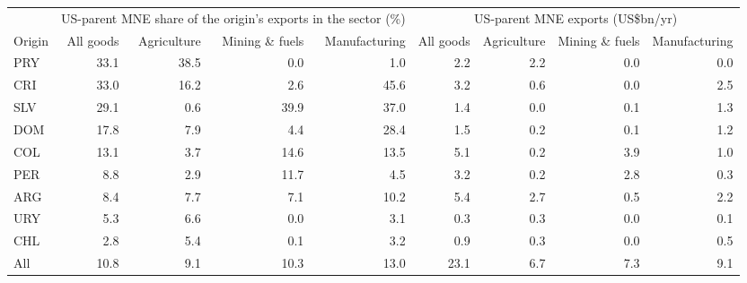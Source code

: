 \begin{tabular}{lrrrrrrrr}
\toprule
 & \multicolumn{4}{c}{US-parent MNE share of the origin's exports in the sector (\%)} & \multicolumn{4}{c}{US-parent MNE exports (US\$bn/yr)} \\
Origin & All goods & Agriculture & Mining \& fuels & Manufacturing & All goods & Agriculture & Mining \& fuels & Manufacturing \\
\midrule
PRY & 33.1 & 38.5 & 0.0 & 1.0 & 2.2 & 2.2 & 0.0 & 0.0 \\
CRI & 33.0 & 16.2 & 2.6 & 45.6 & 3.2 & 0.6 & 0.0 & 2.5 \\
SLV & 29.1 & 0.6 & 39.9 & 37.0 & 1.4 & 0.0 & 0.1 & 1.3 \\
DOM & 17.8 & 7.9 & 4.4 & 28.4 & 1.5 & 0.2 & 0.1 & 1.2 \\
COL & 13.1 & 3.7 & 14.6 & 13.5 & 5.1 & 0.2 & 3.9 & 1.0 \\
PER & 8.8 & 2.9 & 11.7 & 4.5 & 3.2 & 0.2 & 2.8 & 0.3 \\
ARG & 8.4 & 7.7 & 7.1 & 10.2 & 5.4 & 2.7 & 0.5 & 2.2 \\
URY & 5.3 & 6.6 & 0.0 & 3.1 & 0.3 & 0.3 & 0.0 & 0.1 \\
CHL & 2.8 & 5.4 & 0.1 & 3.2 & 0.9 & 0.3 & 0.0 & 0.5 \\
\midrule
All & 10.8 & 9.1 & 10.3 & 13.0 & 23.1 & 6.7 & 7.3 & 9.1 \\
\bottomrule
\end{tabular}
